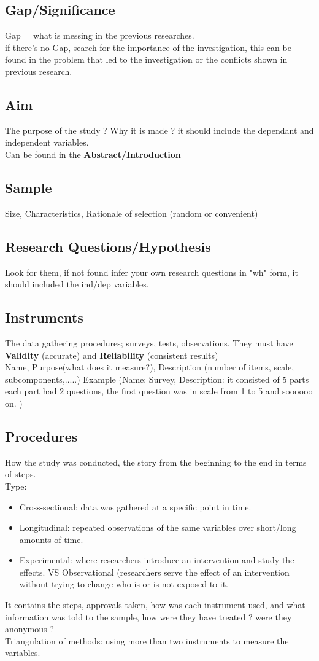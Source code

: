 \documentclass[11pt]{article}
\begin{document}
\subsection{Gap/Significance}
Gap = what is messing in the previous researches.\\
if there's no Gap, search for the importance of the investigation, this can be found in the problem that led to the investigation or the conflicts shown in previous research.
\subsection{Aim}
The purpose of the study ? Why it is made ?
it should include the dependant and independent variables.\\
Can be found in the \textbf{Abstract/Introduction} 
\subsection{Sample}
Size, Characteristics, Rationale of selection (random or convenient) 
\subsection{Research Questions/Hypothesis}
Look for them, if not found infer your own research questions in "wh" form, it should included the ind/dep variables. 
\subsection{Instruments}
The data gathering procedures; surveys, tests, observations. They must have \textbf{Validity} (accurate) and \textbf{Reliability} (consistent results)
\\
Name, Purpose(what does it measure?), Description (number of items, scale, subcomponents,.....)
Example (Name: Survey, Description: it consisted of 5 parts each part had 2 questions, the first question was in scale from 1 to 5 and soooooo on. )

\subsection{Procedures}
How the study was conducted, the story from the beginning to the end in terms of steps.\\
Type: \begin{itemize}

\item Cross-sectional: data was gathered at a specific point in time.
\item Longitudinal: repeated observations of the same variables over short/long amounts of time.
\item Experimental: where researchers introduce an intervention and study the effects. VS Observational (researchers serve the effect of an intervention without trying to change who is or is not exposed to it.
\end{itemize}
It contains the steps, approvals taken, how was each instrument used, and what information was told to the sample, how were they have treated ? were they anonymous ?
\\ Triangulation of methods: using more than two instruments to measure the variables.
\end{document}
